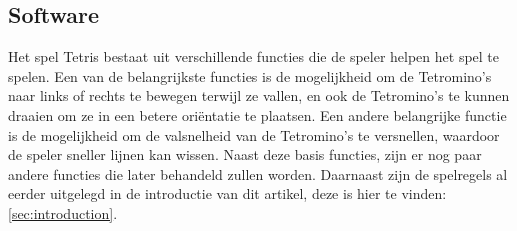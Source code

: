 \subsection{Software}
\label{subsec:methods:software}
Het spel Tetris bestaat uit verschillende functies die de speler helpen het spel te spelen. 
Een van de belangrijkste functies is de mogelijkheid om de Tetromino's naar links of rechts te bewegen terwijl ze vallen, en ook de Tetromino's te kunnen draaien om ze in een betere oriëntatie te plaatsen.
Een andere belangrijke functie is de mogelijkheid om de valsnelheid van de Tetromino's te versnellen, waardoor de speler sneller lijnen kan wissen. 
Naast deze basis functies, zijn er nog paar andere functies die later behandeld zullen worden. 
Daarnaast zijn de spelregels al eerder uitgelegd in de introductie van dit artikel, deze is hier te vinden: \ref{sec:introduction}.


